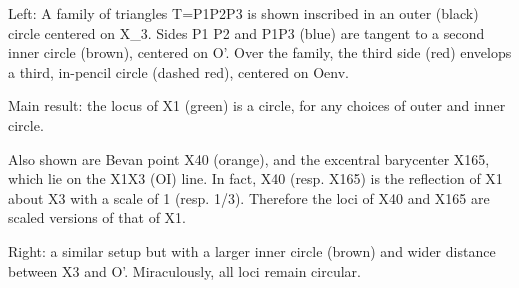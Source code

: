 Left: A family of triangles T=P1P2P3 is shown inscribed in an outer (black) circle centered on X_3. Sides P1 P2 and P1P3 (blue) are tangent to a second inner circle (brown), centered on O'. Over the family, the third side (red) envelops a third, in-pencil circle (dashed red), centered on Oenv.

Main result: the locus of X1 (green) is a circle, for any choices of outer and inner circle.

Also shown are Bevan point X40 (orange), and the excentral barycenter X165, which lie on the X1X3 (OI) line. In fact, X40 (resp. X165) is the reflection of X1 about X3 with a scale of 1 (resp. 1/3). Therefore the loci of X40 and X165 are scaled versions of that of X1.

Right:  a similar setup but with a larger inner circle (brown) and wider distance between X3 and O'. Miraculously, all loci remain circular.